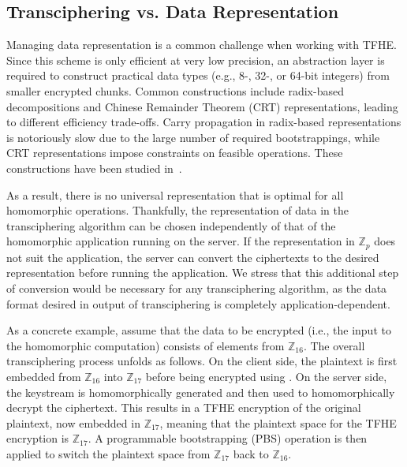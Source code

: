 \subsection{Transciphering vs. Data Representation}
\label{sec:data_representation}



Managing data representation is a common challenge when working with TFHE. Since this scheme is only efficient at very low precision, an abstraction layer is required to construct practical data types (e.g., 8-, 32-, or 64-bit integers) from smaller encrypted chunks. Common constructions include radix-based decompositions and Chinese Remainder Theorem (CRT) representations, leading to different efficiency trade-offs. Carry propagation in radix-based representations is notoriously slow due to the large number of required bootstrappings, while CRT representations impose constraints on feasible operations. These constructions have been studied in~\cite{JC:BBBCLOT23}. 

As a result, there is no universal representation that is optimal for all homomorphic operations. Thankfully, the representation of data in the transciphering algorithm can be chosen independently of that of the homomorphic application running on the server. If the representation in $\mathbb Z_p$ does not suit the application, the server can convert the ciphertexts to the desired representation before running the application. %
We stress that this additional step of conversion would be necessary for any transciphering algorithm, as the data format desired in output of transciphering is completely application-dependent.

	
As a concrete example, assume that the data to be encrypted (i.e., the input to the homomorphic computation) consists of elements from $\mathbb{Z}_{16}$. The overall transciphering process unfolds as follows. On the client side, the plaintext is first embedded from $\mathbb{Z}_{16}$ into $\mathbb{Z}_{17}$ before being encrypted using \coolName. On the server side, the keystream is homomorphically generated and then used to homomorphically decrypt the ciphertext. This results in a TFHE encryption of the original plaintext, now embedded in $\mathbb{Z}_{17}$, meaning that the plaintext space for the TFHE encryption is $\mathbb{Z}_{17}$. A programmable bootstrapping (PBS) operation is then applied to switch the plaintext space from $\mathbb{Z}_{17}$ back to $\mathbb{Z}_{16}$.


